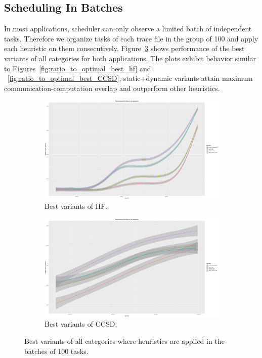 \documentclass[runningheads]{llncs} %
\begin{document}
\subsection{Scheduling In Batches}
In most applications, scheduler can only observe a limited batch of independent tasks. Therefore we organize tasks of each trace file in the group of 100 and apply each heuristic on them consecutively.  Figure~\ref{fig:best_variants_batch} shows performance of the best variants of all categories for both applications. The plots exhibit behavior similar to Figures~\ref{fig:ratio_to_optimal_best_hf} and ~\ref{fig:ratio_to_optimal_best_CCSD}, static+dynamic variants attain maximum communication-computation overlap and outperform other heuristics.
\begin{figure}[htb]
	\centering
	\begin{subfigure}{.5\textwidth}
		\centering
		\includegraphics[width=.95\linewidth]{../ExperimentalResults/batch-100/inverse_ratio_to_optimal_hf_batch-best.pdf}
		\caption{Best variants of HF.}
		\label{fig:hf_best_variants_batch}
	\end{subfigure}%
	\begin{subfigure}{.5\textwidth}
		\centering
		\includegraphics[width=.95\linewidth]{../ExperimentalResults/batch-100/inverse_ratio_to_optimal_ccsd_batch-best.pdf}
		\caption{Best variants of CCSD.}
		\label{fig:hf_best_variants_batch}
	\end{subfigure}
	\caption{Best variants of all categories where heuristics are applied in the batches of 100 tasks.}
	\label{fig:best_variants_batch}
\end{figure}
\end{document}
